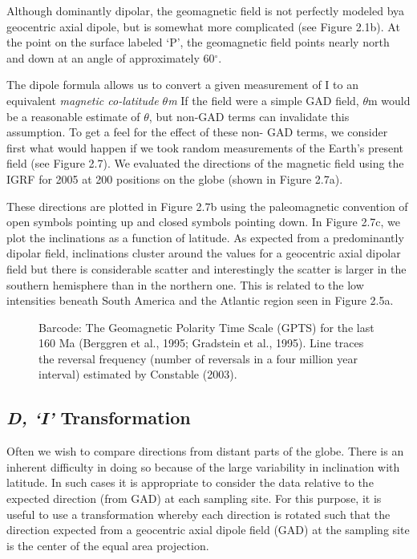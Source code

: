 \documentclass[draft,plain]{tauxe}
\begin{document}
Although dominantly dipolar, the geomagnetic field is not perfectly modeled bya geocentric axial dipole, but is somewhat more complicated (see Figure 2.1b). At the point on the surface labeled `P', the geomagnetic field points
nearly north and down at an angle of approximately 60$^\circ$.\vspace*{-12pt}\break

The dipole formula allows us to convert a given measurement of I to an equivalent {\it magnetic
co-latitude $\theta$m} If the field were a simple GAD field, $\theta$m would be a reasonable estimate of $\theta$, but non-GAD terms can invalidate this assumption. To get a feel for the effect of these non- GAD terms,
we consider first what would happen if we took random measurements of the Earth's present field
(see Figure 2.7). We evaluated the directions of the magnetic field using the IGRF for 2005 at 200
positions on the globe (shown in Figure 2.7a).

These directions are plotted in Figure 2.7b using the paleomagnetic convention of open symbols
pointing up and closed symbols pointing down. In Figure 2.7c, we plot the inclinations as a
function of latitude. As expected from a predominantly dipolar field, inclinations cluster around the
values for a geocentric axial dipolar field but there is considerable scatter and interestingly the scatter
is larger in the southern hemisphere than in the northern one. This is related to the low intensities
beneath South America and the Atlantic region seen in Figure 2.5a.

\begin{figure}
\setcounter{chapter}{14}\setcounter{figure}{11}
\centerline{}
\caption{Barcode: The Geomagnetic Polarity Time Scale (GPTS) for the last 160 Ma (Berggren et al., 1995; Gradstein et al., 1995). Line traces the reversal frequency (number of reversals in a four million year interval) estimated by Constable (2003).}
\end{figure}

\setcounter{chapter}{2}\setcounter{section}{4}

\subsection{\textit{D, `I'} Transformation}

Often we wish to compare directions from distant parts of the globe. There is an inherent difficulty
in doing so because of the large variability in inclination with latitude. In such cases it is appropriate
to consider the data relative to the expected direction (from GAD) at each sampling site. For this
purpose, it is useful to use a transformation whereby each direction is rotated such that the direction
expected from a geocentric axial dipole field (GAD) at the sampling site is the center of the equal
area projection.
\end{document}
